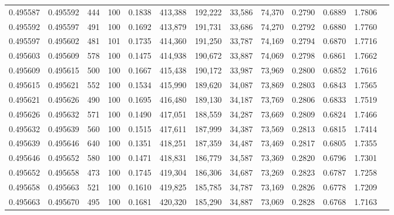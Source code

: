 \begin{tabular}{rrrrrrrrrrrrr}
0.495587 & 0.495592 &   444 & 100 &                                     0.1838 & 413,388 & 192,222 &  33,586 &  74,370 & 0.2790 & 0.6889 & 1.7806 \\
0.495592 & 0.495597 &   491 & 100 &                                     0.1692 & 413,879 & 191,731 &  33,686 &  74,270 & 0.2792 & 0.6880 & 1.7760 \\
0.495597 & 0.495602 &   481 & 101 &                                     0.1735 & 414,360 & 191,250 &  33,787 &  74,169 & 0.2794 & 0.6870 & 1.7716 \\
0.495603 & 0.495609 &   578 & 100 &                                     0.1475 & 414,938 & 190,672 &  33,887 &  74,069 & 0.2798 & 0.6861 & 1.7662 \\
0.495609 & 0.495615 &   500 & 100 &                                     0.1667 & 415,438 & 190,172 &  33,987 &  73,969 & 0.2800 & 0.6852 & 1.7616 \\
0.495615 & 0.495621 &   552 & 100 &                                     0.1534 & 415,990 & 189,620 &  34,087 &  73,869 & 0.2803 & 0.6843 & 1.7565 \\
0.495621 & 0.495626 &   490 & 100 &                                     0.1695 & 416,480 & 189,130 &  34,187 &  73,769 & 0.2806 & 0.6833 & 1.7519 \\
0.495626 & 0.495632 &   571 & 100 &                                     0.1490 & 417,051 & 188,559 &  34,287 &  73,669 & 0.2809 & 0.6824 & 1.7466 \\
0.495632 & 0.495639 &   560 & 100 &                                     0.1515 & 417,611 & 187,999 &  34,387 &  73,569 & 0.2813 & 0.6815 & 1.7414 \\
0.495639 & 0.495646 &   640 & 100 &                                     0.1351 & 418,251 & 187,359 &  34,487 &  73,469 & 0.2817 & 0.6805 & 1.7355 \\
0.495646 & 0.495652 &   580 & 100 &                                     0.1471 & 418,831 & 186,779 &  34,587 &  73,369 & 0.2820 & 0.6796 & 1.7301 \\
0.495652 & 0.495658 &   473 & 100 &                                     0.1745 & 419,304 & 186,306 &  34,687 &  73,269 & 0.2823 & 0.6787 & 1.7258 \\
0.495658 & 0.495663 &   521 & 100 &                                     0.1610 & 419,825 & 185,785 &  34,787 &  73,169 & 0.2826 & 0.6778 & 1.7209 \\
0.495663 & 0.495670 &   495 & 100 &                                     0.1681 & 420,320 & 185,290 &  34,887 &  73,069 & 0.2828 & 0.6768 & 1.7163 \\

\end{tabular}
